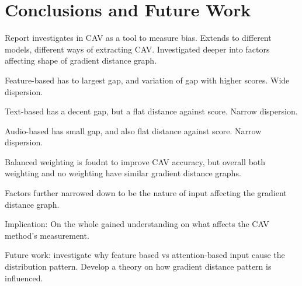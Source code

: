 \chapter{Conclusions and Future Work} \label{chap:conclusions}

Report investigates in CAV as a tool to measure bias. Extends to different models, different ways of extracting CAV.  Investigated deeper into factors affecting shape of gradient distance graph.

Feature-based has to largest gap, and variation of gap with higher scores. Wide dispersion.

Text-based has a decent gap, but a flat distance against score. Narrow dispersion.

Audio-based has small gap, and also flat distance against score. Narrow dispersion.

Balanced weighting is foudnt to improve CAV accuracy, but overall both weighting and no weighting have similar gradient distance graphs.

Factors further narrowed down to be the nature of input affecting the gradient distance graph.

Implication: On the whole gained understanding on what affects the CAV method's measurement.

Future work: investigate why feature based vs attention-based input cause the distribution pattern. Develop a theory on how gradient distance pattern is influenced.